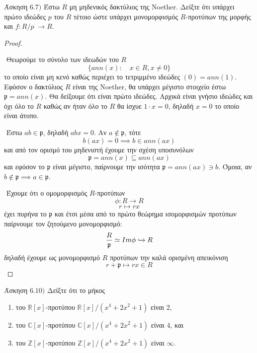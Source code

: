 \documentclass[oneside,a4paper]{article}
\newcommand {\tl}{\textlatin}
\begin{document}
\noindent Άσκηση $6.7)$
\quad Έστω $R$ μη μηδενικός δακτύλιος της \tl{Noether}. Δείξτε ότι υπάρχει πρώτο ιδεώδες $p$ του $R$ τέτοιο ώστε υπάρχει μονομορφισμός  $R$-προτύπων της μορφής και $f:{R}/{p}\;\to R$.
\vspace*{1cm}
\begin{proof} $ $

	$ $\newline
	Θεωρούμε το σύνολο των ιδεωδών του $R$
	$$\{ ann(x): \quad x \in R, x \neq 0\}$$
	το οποίο είναι μη κενό καθώς περιέχει το τετριμμένο ιδεώδες $(0) = ann(1)$. Εφόσον ο δακτύλιος $R$ είναι της \tl{Noether}, θα υπάρχει μέγιστο στοιχείο έστω $\mathfrak{p} = ann(x)$. Θα δείξουμε ότι είναι πρώτο ιδεώδες. Αρχικά είναι γνήσιο ιδεώδες και όχι όλο το $R$ καθώς αν ήταν όλο το $R$ θα ίσχυε $1\cdot x = 0$, δηλαδή $x=0$ το οποίο είναι άτοπο.

	$ $\newline
	Έστω $ab \in \mathfrak{p}$, δηλαδή $abx = 0$. Αν $a \not\in \mathfrak{p}$, τότε 
	$$b(ax) = 0 \implies b \in ann(ax)$$
	και από τον ορισμό του μηδενιστή έχουμε την σχέση υποσυνόλων
	$$ \mathfrak{p} = ann(x) \subseteq ann(ax)$$
	και εφόσον το $\mathfrak{p}$ είναι μέγιστο, παίρνουμε την ισότητα $\mathfrak{p} = ann(ax) \ni b$. Όμοια, αν $b\not\in \mathfrak{p} \implies a \in \mathfrak{p}$.

	$ $\newline
	Έχουμε ότι ο ομομορφισμός $R$-προτύπων 
	$$\phi: R \longrightarrow R$$
	$$r \longmapsto rx$$
	έχει πυρήνα το $\mathfrak{p}$ και έτσι μέσα από το πρώτο θεώρημα ισομορφισμών προτύπων παίρνουμε τον ζητούμενο μονομορφισμό:
	$$\frac{R}{\mathfrak{p}} \simeq Im\phi \xhookrightarrow{} R$$
	δηλαδή έχουμε ως μονομορφισμό $R$ προτύπων την καλά ορισμένη απεικόνιση $$r + \mathfrak{p} \mapsto rx \in R$$
\end{proof}
\pagebreak


\noindent Άσκηση $6.10)$
\quad Δείξτε ότι το μήκος \begin{enumerate}
	\item	του $\mathbb{R}[x]$-προτύπου ${\mathbb{R}[x]}/{({{x}^{4}}+2{{x}^{2}}+1)}$ είναι 2, 
	\item του $\mathbb{C}[x]$-προτύπου ${\mathbb{C}[x]}/{({{x}^{4}}+2{{x}^{2}}+1)}$ είναι 4,
	και
	\item	του $\mathbb{Z}[x]$-προτύπου ${\mathbb{Z}[x]}/{({{x}^{4}}+2{{x}^{2}}+1)}$ είναι $\infty $. \end{enumerate}
\end{document}
